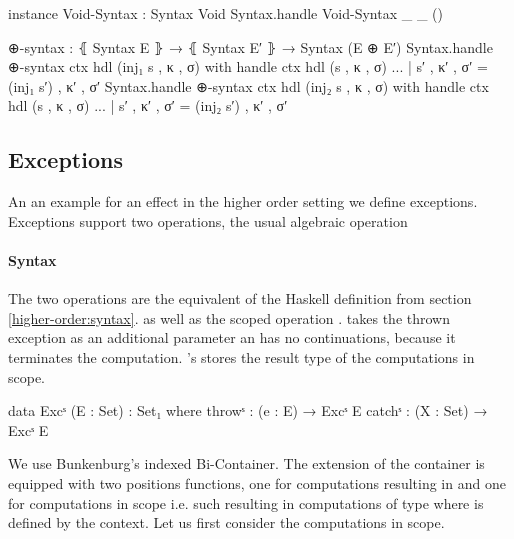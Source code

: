 \begin{code}
instance
  Void-Syntax : Syntax Void
  Syntax.handle Void-Syntax _ _ ()

  ⊕-syntax : ⦃ Syntax E ⦄ → ⦃ Syntax E′ ⦄ → Syntax (E ⊕ E′)
  Syntax.handle ⊕-syntax ctx hdl (inj₁ s , κ , σ) with handle ctx hdl (s , κ , σ)
  ... | s′ , κ′ , σ′ = (inj₁ s′) , κ′ , σ′
  Syntax.handle ⊕-syntax ctx hdl (inj₂ s , κ , σ) with handle ctx hdl (s , κ , σ)
  ... | s′ , κ′ , σ′ = (inj₂ s′) , κ′ , σ′
\end{code}


\subsection{Exceptions}
\label{higher-order:exceptions}

An an example for an effect in the higher order setting we define exceptions.
Exceptions support two operations, the usual algebraic operation

\paragraph{Syntax}
The two operations are the equivalent of the Haskell definition from section
\ref{higher-order:syntax}.
 as well as the scoped operation .
 takes the thrown exception as an additional parameter an
has no continuations, because it terminates the computation.
's  stores the result type of the
computations in scope.

\begin{code}
data Excˢ (E : Set) : Set₁ where
  throwˢ  : (e : E) → Excˢ E
  catchˢ  : (X : Set) → Excˢ E
\end{code}
We use Bunkenburg's indexed Bi-Container.
The extension of the container is equipped with two positions functions, one for
computations resulting in
\AgdaSpace{}\AgdaSpace{}
and one for computations in scope i.e. such resulting in computations of type
\AgdaSpace{}\AgdaSpace{}
where  is defined by the context.
Let us first consider the computations in scope.

